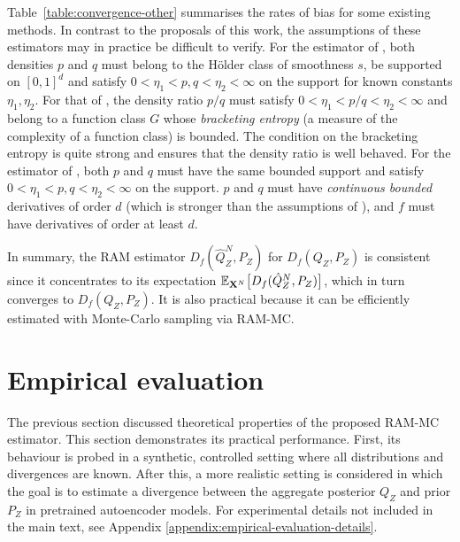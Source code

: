 Table~\ref{table:convergence-other} summarises the rates of bias for some existing methods.
In contrast to the proposals of this work, the assumptions of these estimators may in practice be difficult to verify.
For the estimator of \cite{krishnamurthy14icml}, both densities $p$ and $q$ must belong to the H\"older class of smoothness $s$, be supported on $[0,1]^d$ and satisfy $0<\eta_1 < p, q < \eta_2<\infty$ on the support for known constants $\eta_1, \eta_2$.
For that of \cite{nguyen10ratio}, the density ratio $p/q$ must satisfy $0<\eta_1 < p/q < \eta_2<\infty$ and belong to a function class $G$ whose \emph{bracketing entropy} (a measure of the complexity of a function class) is bounded. The condition on the bracketing entropy is quite strong and ensures that the density ratio is well behaved.
For the estimator of \cite{moon14ensemble}, both $p$ and $q$ must have the same bounded support and satisfy $0<\eta_1 < p, q < \eta_2<\infty$ on the support. $p$ and $q$ must have \emph{continuous bounded} derivatives of order $d$ (which is stronger than the assumptions of \cite{krishnamurthy14icml}), and $f$ must have derivatives of order at least $d$.

In summary, the RAM estimator $D_f(\hat{Q}_Z^N , P_Z)$ for $D_f(Q_Z , P_Z)$ is consistent since it concentrates to its expectation $\mathbb{E}_{\mathbf{X}^N}\bigl[D_f(\hat{Q}_Z^N , P_Z)\bigr]$, which in turn converges to $D_f(Q_Z , P_Z)$.
It is also practical because it can be efficiently estimated with Monte-Carlo sampling via RAM-MC.

\section{Empirical evaluation}\label{sec:experiments}

The previous section discussed theoretical properties of the proposed RAM-MC estimator.
This section demonstrates its practical performance.
First, its behaviour is probed in a synthetic, controlled setting where all distributions and divergences are known.
After this, a more realistic setting is considered in which the goal is to estimate a divergence between the aggregate posterior $Q_Z$ and prior $P_Z$ in pretrained autoencoder models. 
For experimental details not included in the main text,
see Appendix \ref{appendix:empirical-evaluation-details}.


